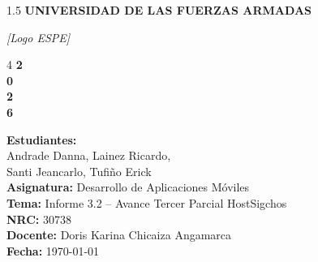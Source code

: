 \documentclass[12pt,letterpaper]{report}
\begin{document}
\begin{titlepage}
\thispagestyle{empty}
\begin{spacing}{1.5}
{\huge \bfseries UNIVERSIDAD DE LAS FUERZAS ARMADAS}\\[10pt]
\centering
\end{spacing}
\vspace{1cm}
\begin{minipage}{2cm}
\hspace{0.5cm}
\end{minipage}\hfill
\begin{minipage}{9cm}
    \centering
    \vspace{2cm}
    \textit{[Logo ESPE]}
\end{minipage}\hfill
\begin{minipage}{3cm}
\hspace{1cm}
\vspace{1.cm}
\begin{spacing}{4}
 {\color{white}\fontsize{60}{70}\selectfont\bfseries 2\\0\\2\\6}
\end{spacing}
\end{minipage}

\vspace{3cm}
\begin{flushleft}
{\LARGE
\textbf{Estudiantes:}\\
\hspace{1cm} Andrade Danna, Lainez Ricardo, \\
\hspace{1cm} Santi Jeancarlo, Tufiño Erick\\[10pt]
\textbf{Asignatura:} Desarrollo de Aplicaciones Móviles\\
\textbf{Tema:} Informe 3.2 -- Avance Tercer Parcial HostSigchos\\
\textbf{NRC:} 30738\\
\textbf{Docente:} Doris Karina Chicaiza Angamarca\\
\textbf{Fecha:} \today\\}
\end{flushleft}
\end{titlepage}
\restoregeometry
\end{document}
